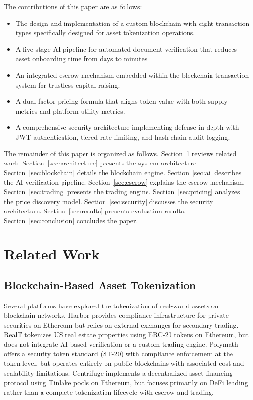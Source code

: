 \documentclass[conference]{IEEEtran}
\begin{document}
The contributions of this paper are as follows:
\begin{itemize}
    \item The design and implementation of a custom blockchain with eight transaction types specifically designed for asset tokenization operations.
    \item A five-stage AI pipeline for automated document verification that reduces asset onboarding time from days to minutes.
    \item An integrated escrow mechanism embedded within the blockchain transaction system for trustless capital raising.
    \item A dual-factor pricing formula that aligns token value with both supply metrics and platform utility metrics.
    \item A comprehensive security architecture implementing defense-in-depth with JWT authentication, tiered rate limiting, and hash-chain audit logging.
\end{itemize}

The remainder of this paper is organized as follows. Section~\ref{sec:related} reviews related work. Section~\ref{sec:architecture} presents the system architecture. Section~\ref{sec:blockchain} details the blockchain engine. Section~\ref{sec:ai} describes the AI verification pipeline. Section~\ref{sec:escrow} explains the escrow mechanism. Section~\ref{sec:trading} presents the trading engine. Section~\ref{sec:pricing} analyzes the price discovery model. Section~\ref{sec:security} discusses the security architecture. Section~\ref{sec:results} presents evaluation results. Section~\ref{sec:conclusion} concludes the paper.

\section{Related Work}
\label{sec:related}

\subsection{Blockchain-Based Asset Tokenization}

Several platforms have explored the tokenization of real-world assets on blockchain networks. Harbor \cite{ref2} provides compliance infrastructure for private securities on Ethereum but relies on external exchanges for secondary trading. RealT \cite{ref3} tokenizes US real estate properties using ERC-20 tokens on Ethereum, but does not integrate AI-based verification or a custom trading engine. Polymath \cite{ref4} offers a security token standard (ST-20) with compliance enforcement at the token level, but operates entirely on public blockchains with associated cost and scalability limitations. Centrifuge \cite{ref5} implements a decentralized asset financing protocol using Tinlake pools on Ethereum, but focuses primarily on DeFi lending rather than a complete tokenization lifecycle with escrow and trading.
\end{document}

